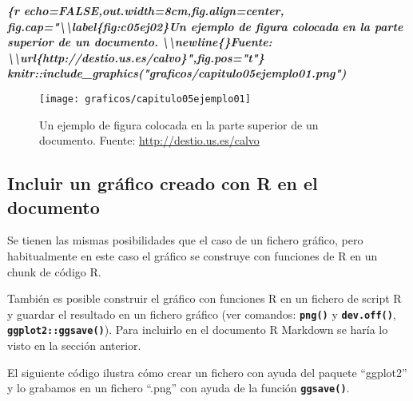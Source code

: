 \documentclass[12pt,a4paper,]{book}
\newenvironment{Shaded}{\begin{snugshade}}{\end{snugshade}}
\newcommand{\InformationTok}[1]{\textcolor[rgb]{0.56,0.35,0.01}{\textbf{\textit{#1}}}}
\numberwithin{dummy}{section}
\theoremstyle{ocrenumbox}
\theoremstyle{blacknumex}
\theoremstyle{blacknumbox}
\theoremstyle{ocrenum}
\theoremstyle{ocrenum}
\begin{document}
\begin{Shaded}
\begin{Highlighting}[]
\InformationTok{\textasciigrave{}\textasciigrave{}\textasciigrave{}\{r echo=FALSE,out.width=\textquotesingle{}8cm\textquotesingle{},fig.align=\textquotesingle{}center\textquotesingle{},}
\InformationTok{fig.cap="\textbackslash{}\textbackslash{}label\{fig:c05ej02\}Un ejemplo de figura colocada }
\InformationTok{en la parte superior de un documento. }
\InformationTok{\textbackslash{}\textbackslash{}newline\{\}Fuente: \textbackslash{}\textbackslash{}url\{http://destio.us.es/calvo\}",fig.pos="t"\}}
\InformationTok{knitr::include\_graphics("graficos/capitulo05ejemplo01.png")}
\InformationTok{\textasciigrave{}\textasciigrave{}\textasciigrave{}}
\end{Highlighting}
\end{Shaded}

\begin{figure}[t]
 
 {\centering \texttt{[image: graficos/capitulo05ejemplo01]} 
 
 }
 
 \caption{\label{fig:c05ej02}Un ejemplo de figura colocada en la parte superior de un documento. \newline{}Fuente: \url{http://destio.us.es/calvo}}\label{fig:unnamed-chunk-23}
 \end{figure}

\hypertarget{incluir-un-gruxe1fico-creado-con-r-en-el-documento}{%
\subsection{Incluir un gráfico creado con R en el
documento}\label{incluir-un-gruxe1fico-creado-con-r-en-el-documento}}

Se tienen las mismas posibilidades que el caso de un fichero gráfico,
pero habitualmente en este caso el gráfico se construye con funciones de
R en un chunk de código R.

También es posible construir el gráfico con funciones R en un fichero de
script R y guardar el resultado en un fichero gráfico (ver comandos:
\textbf{\texttt{png()}} y \textbf{\texttt{dev.off()}},
\textbf{\texttt{ggplot2::ggsave()}}). Para incluirlo en el documento R
Markdown se haría lo visto en la sección anterior.

El siguiente código ilustra cómo crear un fichero con ayuda del paquete
``ggplot2'' y lo grabamos en un fichero ``.png'' con ayuda de la función
\textbf{\texttt{ggsave()}}.
\end{document}
